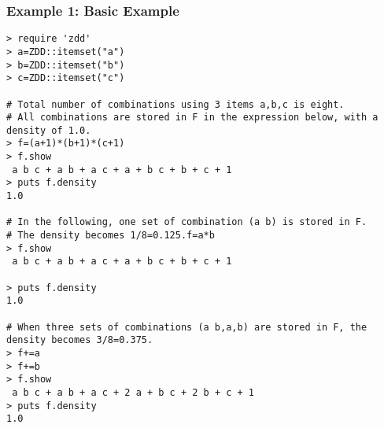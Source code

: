 \subsubsection*{Example 1: Basic Example}



\begin{Verbatim}[baselinestretch=0.7,frame=single]
> require 'zdd'
> a=ZDD::itemset("a")
> b=ZDD::itemset("b")
> c=ZDD::itemset("c")

# Total number of combinations using 3 items a,b,c is eight.
# All combinations are stored in F in the expression below, with a density of 1.0.
> f=(a+1)*(b+1)*(c+1)
> f.show
 a b c + a b + a c + a + b c + b + c + 1
> puts f.density
1.0

# In the following, one set of combination (a b) is stored in F.
# The density becomes 1/8=0.125.f=a*b
> f.show
 a b c + a b + a c + a + b c + b + c + 1

> puts f.density
1.0

# When three sets of combinations (a b,a,b) are stored in F, the density becomes 3/8=0.375.
> f+=a
> f+=b
> f.show
 a b c + a b + a c + 2 a + b c + 2 b + c + 1
> puts f.density
1.0
\end{Verbatim}
